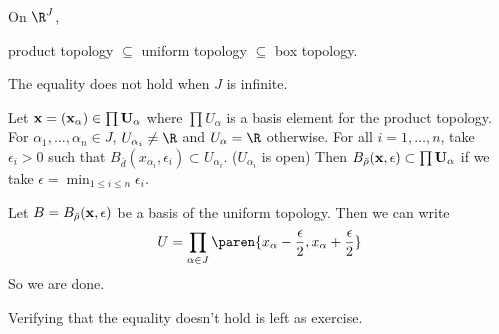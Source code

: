  On \(\R^J\),
\begin{center}
    product topology \(\subseteq\) uniform topology \(\subseteq\) box topology.
\end{center}
The equality does not hold when \(J\) is infinite.

\pf
{} Let \(\bf{x} = (x_\alpha) \in \prod U_\alpha\) where \(\prod U_\alpha\) is a basis element for the product topology. For \(\alpha_1, \dots, \alpha_n \in J\), \(U_{\alpha_i} \neq \R\) and \(U_\alpha = \R\) otherwise. For all \(i = 1, \dots, n\), take \(\epsilon_i > 0\) such that \(B_{\bar{d}}(x_{\alpha_i}, \epsilon_i) \subset U_{\alpha_i}\). (\(U_{\alpha_i}\) is open) Then \(B_{\bar{\rho}}(\bf{x}, \epsilon) \subset \prod U_\alpha\) if we take \(\epsilon = \min_{1\leq i\leq n} \epsilon_i\).

 Let \(B = B_{\bar{\rho}} (\bf{x}, \epsilon)\) be a basis of the uniform topology. Then we can write
\[
    U = \prod_{\alpha \in J} \paren{x_\alpha - \frac{\epsilon}{2}, x_\alpha + \frac{\epsilon}{2}}
\]
So we are done.

Verifying that the equality doesn't hold is left as exercise.
\pagebreak
